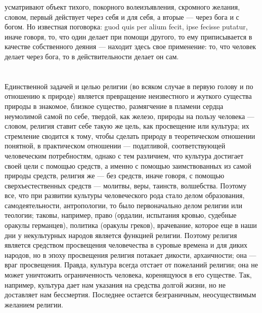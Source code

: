 \documentclass[12pt,oneside]{book}
\begin{document}
усматривают объект тихого, покорного волеизъявления, скромного желания, словом, первый действует через себя и для себя, а вторые --- через бога и с богом. Но известная поговорка: guod quis per alium fecit, ipse fecisse putatur, иначе говоря, то, что один делает при помощи другого, то ему приписывается в качестве собственного деяния --- находит здесь свое применение: то, что человек делает через бога, то в действительности делает он сам.


\chapter{}

Единственной задачей и целью религии (во всяком случае в первую голову и по отношению к природе) является превращение неизвестного и жуткого существа природы в знакомое, близкое существо, размягчение в пламени сердца неумолимой самой по себе, твердой, как железо, природы на пользу человека --- словом, религия ставит себе такую же цель, как просвещение или культура; их стремление сводится к тому, чтобы сделать природу в теоретическом отношении понятной, в практическом отношении --- податливой, соответствующей человеческим потребностям, однако с тем различием, что культура достигает своей цели с помощью средств, а именно с помощью заимствованных из самой природы средств, религия же --- без средств, иначе говоря, с помощью сверхъестественных средств --- молитвы, веры, таинств, волшебства. Поэтому все, что при развитии культуры человеческого рода стало делом образования, самодеятельности, антропологии, то было первоначально делом религии или теологии; таковы, например, право (ордалии, испытания кровью, судебные оракулы германцев), политика (оракулы греков), врачевание, которое еще в наши дни у некультурных народов является функцией религии. Поэтому религия является средством просвещения человечества в суровые времена и для диких народов, но в эпоху просвещения религия потакает дикости, архаичности; она --- враг просвещения. Правда, культура всегда отстает от пожеланий религии; она не может уничтожить ограниченность человека, коренящуюся в его существе. Так, например, культура дает нам указания на средства долгой жизни, но не доставляет нам бессмертия. Последнее остается безграничным, неосуществимым желанием религии.


\chapter{}
\end{document}
